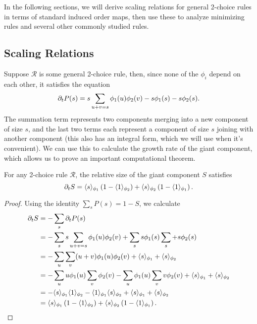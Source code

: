 \documentclass[twoside,10pt]{article}
\begin{document}
In the following sections, we will derive scaling relations for general 2-choice rules in terms of standard induced order maps, then use these to analyze minimizing rules and several other commonly studied rules.


\subsection{Scaling Relations}

Suppose $\mathcal{R}$ is some general 2-choice rule, then, since none of the $\phi_i$ depend on each other, it satisfies the equation
	\begin{equation}
		\label{smoluchowski}
                \partial_{t}{P(s)} = s \sum_{u+v=s} \phi_1(u) \phi_2(v) - s \phi_1(s) - s\phi_2(s).
	\end{equation}
	The summation term represents two components merging into a new component of size $s$, and the last two terms each represent a component of size $s$ joining with another component (this also has an integral form, which we will use when it's convenient). We can use this to calculate the growth rate of the giant component, which allows us to prove an important computational theorem.

\begin{lem}
        \label{2c-sdelS}
        For any 2-choice rule $\mathcal{R}$, the relative size of the giant component $S$ satisfies
	\[
		\partial_{t}{S} = \langle s \rangle_{\phi_1}\left( 1-\langle 1 \rangle_{\phi_2} \right) + \langle s \rangle_{\phi_2}\left( 1-\langle 1 \rangle_{\phi_1} \right).
	\] 
\end{lem}
\begin{proof}
        Using the identity $\sum_s P(s) = 1-S$, we calculate
        \begin{align*}
                \partial_{t}{S} &= - \sum_s \partial_{t}{P(s)} \\
                          &= - \sum_s s \sum_{u+v=s}\phi_1(u)\phi_2(v) + \sum_s s \phi_1(s) \sum_s + s \phi_2(s) \\
                          &= - \sum_u \sum_v (u+v) \phi_1(u)\phi_2(v) + \langle s \rangle_{\phi_1} + \langle s \rangle_{\phi_2} \\
                          &= -\sum_{u}u \phi_1(u) \sum_{v} \phi_2(v) - \sum_{u}\phi_1(u)\sum_{v}v \phi_2(v) + \langle s \rangle_{\phi_1} + \langle s \rangle_{\phi_2} \\
                          &= -\langle s \rangle_{\phi_1}\langle 1 \rangle_{\phi_2} - \langle 1 \rangle_{\phi_1}\langle s \rangle_{\phi_2} + \langle s \rangle_{\phi_1}+\langle s \rangle_{\phi_2} \\
                          &= \langle s \rangle_{\phi_1}\left( 1-\langle 1 \rangle_{\phi_2} \right) + \langle s \rangle_{\phi_2}\left( 1-\langle 1 \rangle_{\phi_1} \right).
        \end{align*}
\end{proof}
\end{document}
